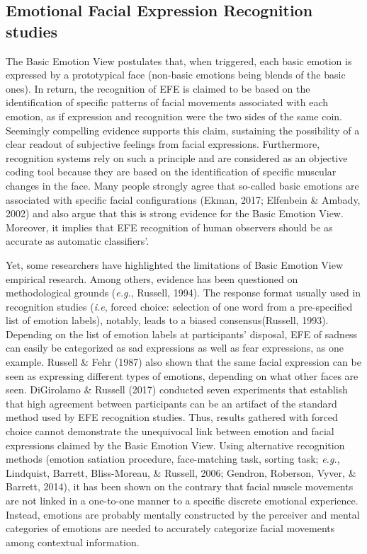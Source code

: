 \documentclass[
  english,
  doc]{apa7}
\begin{document}
\hypertarget{emotional-facial-expression-recognition-studies}{%
\subsection{Emotional Facial Expression Recognition studies}\label{emotional-facial-expression-recognition-studies}}

The Basic Emotion View postulates that, when triggered, each basic emotion is expressed by a prototypical face (non-basic emotions being blends of the basic ones). In return, the recognition of EFE is claimed to be based on the identification of specific patterns of facial movements associated with each emotion, as if expression and recognition were the two sides of the same coin. Seemingly compelling evidence supports this claim, sustaining the possibility of a clear readout of subjective feelings from facial expressions. Furthermore, recognition systems rely on such a principle and are considered as an objective coding tool because they are based on the identification of specific muscular changes in the face. Many people strongly agree that so-called basic emotions are associated with specific facial configurations (Ekman, 2017; Elfenbein \& Ambady, 2002) and also argue that this is strong evidence for the Basic Emotion View. Moreover, it implies that EFE recognition of human observers should be as accurate as automatic classifiers'.

Yet, some researchers have highlighted the limitations of Basic Emotion View empirical research. Among others, evidence has been questioned on methodological grounds (\emph{e.g.}, Russell, 1994). The response format usually used in recognition studies (\emph{i.e}, forced choice: selection of one word from a pre-specified list of emotion labels), notably, leads to a biased consensus(Russell, 1993). Depending on the list of emotion labels at participants' disposal, EFE of sadness can easily be categorized as sad expressions as well as fear expressions, as one example. Russell \& Fehr (1987) also shown that the same facial expression can be seen as expressing different types of emotions, depending on what other faces are seen. DiGirolamo \& Russell (2017) conducted seven experiments that establish that high agreement between participants can be an artifact of the standard method used by EFE recognition studies. Thus, results gathered with forced choice cannot demonstrate the unequivocal link between emotion and facial expressions claimed by the Basic Emotion View. Using alternative recognition methods (emotion satiation procedure, face-matching task, sorting task; \emph{e.g.}, Lindquist, Barrett, Bliss-Moreau, \& Russell, 2006; Gendron, Roberson, Vyver, \& Barrett, 2014), it has been shown on the contrary that facial muscle movements are not linked in a one-to-one manner to a specific discrete emotional experience. Instead, emotions are probably mentally constructed by the perceiver and mental categories of emotions are needed to accurately categorize facial movements among contextual information.
\end{document}
